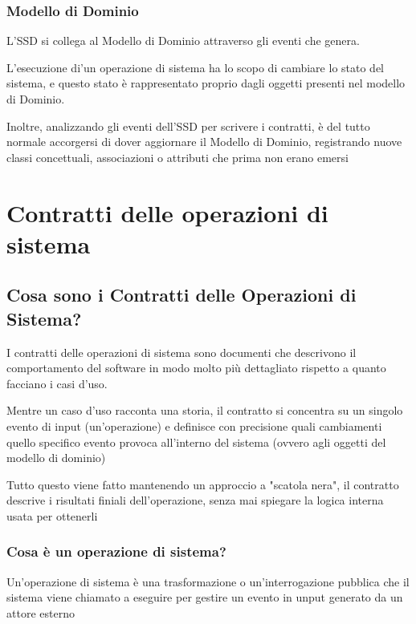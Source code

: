 \subsubsection{Modello di Dominio}
L'SSD si collega al Modello di Dominio attraverso gli eventi che genera.

\vspace{\baselineskip}

L'esecuzione di'un operazione di sistema ha lo scopo di cambiare lo stato del sistema, e questo stato è rappresentato proprio dagli oggetti presenti nel modello di Dominio.

\vspace{\baselineskip}

Inoltre, analizzando gli eventi dell'SSD per scrivere i contratti, è del tutto normale accorgersi di dover aggiornare il Modello di Dominio, registrando nuove classi concettuali, associazioni o attributi che prima non erano emersi

\section{Contratti delle operazioni di sistema}
\subsection{Cosa sono i Contratti delle Operazioni di Sistema?}
I contratti delle operazioni di sistema sono documenti che descrivono il comportamento del software in modo molto più dettagliato rispetto a quanto facciano i casi d'uso.

\vspace{\baselineskip}

Mentre un caso d'uso racconta una storia, il contratto si concentra su un singolo evento di input (un'operazione) e definisce con precisione quali cambiamenti quello specifico evento provoca all'interno del sistema (ovvero agli oggetti del modello di dominio)

Tutto questo viene fatto mantenendo un approccio a "scatola nera", il contratto descrive i risultati finiali dell'operazione, senza mai spiegare la logica interna usata per ottenerli

\subsubsection{Cosa è un operazione di sistema?}
Un'operazione di sistema è una trasformazione o un'interrogazione pubblica che il sistema viene chiamato a eseguire per gestire un evento in unput generato da un attore esterno

